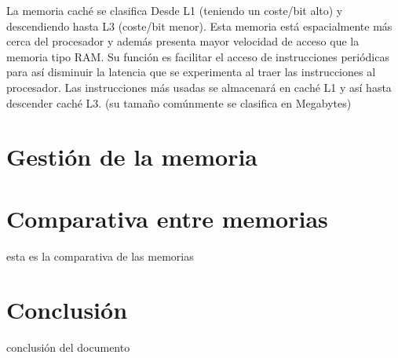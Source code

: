 \documentclass{article}
\begin{document}
La memoria caché se clasifica Desde L1 (teniendo un coste/bit alto) y descendiendo hasta L3 (coste/bit menor). Esta memoria está espacialmente más cerca del procesador y además presenta mayor velocidad de acceso que la memoria tipo RAM. Su función es facilitar el acceso de instrucciones 
 periódicas 
 para así disminuir la latencia que se experimenta al traer las instrucciones al procesador. Las instrucciones más usadas se almacenará en caché L1 y así hasta descender caché L3.
(su tamaño comúnmente se clasifica en Megabytes)

\section{Gestión de la memoria}


\section{Comparativa entre memorias}
 esta es la comparativa de las memorias

\section{Conclusión} 
conclusión del documento





\cite{rebollo}
\cite{figura1}
\end{document}
